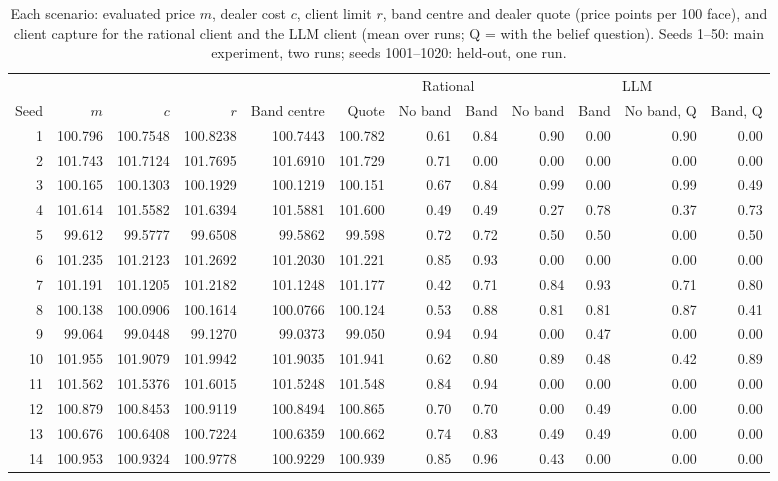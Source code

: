 \begin{table}[p]
\centering\scriptsize
\caption{Each scenario: evaluated price $m$, dealer cost $c$, client limit $r$, band centre and dealer quote (price points per 100 face), and client capture for the rational client and the LLM client (mean over runs; Q = with the belief question). Seeds 1--50: main experiment, two runs; seeds 1001--1020: held-out, one run.}
\label{tab:scenarios}
\begin{tabular}{@{}rrrrrr|rr|rrrr@{}}
\toprule
 & & & & & & \multicolumn{2}{c|}{Rational} & \multicolumn{4}{c}{LLM} \\
Seed & $m$ & $c$ & $r$ & Band centre & Quote & No band & Band & No band & Band & No band, Q & Band, Q \\
\midrule
1 & 100.796 & 100.7548 & 100.8238 & 100.7443 & 100.782 & 0.61 & 0.84 & 0.90 & 0.00 & 0.90 & 0.00 \\
2 & 101.743 & 101.7124 & 101.7695 & 101.6910 & 101.729 & 0.71 & 0.00 & 0.00 & 0.00 & 0.00 & 0.00 \\
3 & 100.165 & 100.1303 & 100.1929 & 100.1219 & 100.151 & 0.67 & 0.84 & 0.99 & 0.00 & 0.99 & 0.49 \\
4 & 101.614 & 101.5582 & 101.6394 & 101.5881 & 101.600 & 0.49 & 0.49 & 0.27 & 0.78 & 0.37 & 0.73 \\
5 & 99.612 & 99.5777 & 99.6508 & 99.5862 & 99.598 & 0.72 & 0.72 & 0.50 & 0.50 & 0.00 & 0.50 \\
6 & 101.235 & 101.2123 & 101.2692 & 101.2030 & 101.221 & 0.85 & 0.93 & 0.00 & 0.00 & 0.00 & 0.00 \\
7 & 101.191 & 101.1205 & 101.2182 & 101.1248 & 101.177 & 0.42 & 0.71 & 0.84 & 0.93 & 0.71 & 0.80 \\
8 & 100.138 & 100.0906 & 100.1614 & 100.0766 & 100.124 & 0.53 & 0.88 & 0.81 & 0.81 & 0.87 & 0.41 \\
9 & 99.064 & 99.0448 & 99.1270 & 99.0373 & 99.050 & 0.94 & 0.94 & 0.00 & 0.47 & 0.00 & 0.00 \\
10 & 101.955 & 101.9079 & 101.9942 & 101.9035 & 101.941 & 0.62 & 0.80 & 0.89 & 0.48 & 0.42 & 0.89 \\
11 & 101.562 & 101.5376 & 101.6015 & 101.5248 & 101.548 & 0.84 & 0.94 & 0.00 & 0.00 & 0.00 & 0.00 \\
12 & 100.879 & 100.8453 & 100.9119 & 100.8494 & 100.865 & 0.70 & 0.70 & 0.00 & 0.49 & 0.00 & 0.00 \\
13 & 100.676 & 100.6408 & 100.7224 & 100.6359 & 100.662 & 0.74 & 0.83 & 0.49 & 0.49 & 0.00 & 0.00 \\
14 & 100.953 & 100.9324 & 100.9778 & 100.9229 & 100.939 & 0.85 & 0.96 & 0.43 & 0.00 & 0.00 & 0.00 \\

\end{tabular}
\end{table}
